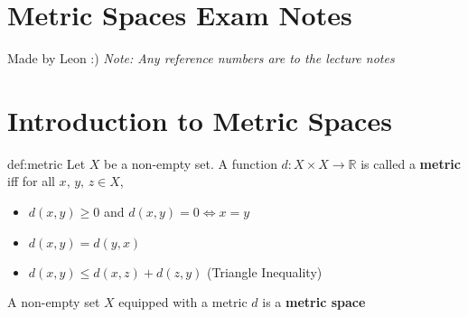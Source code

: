 \documentclass[landscape, 8pt]{extarticle}
\begin{document}
\setlength{\abovedisplayskip}{3.5pt}
\setlength{\belowdisplayskip}{3.5pt}
\setlength{\abovedisplayshortskip}{3.5pt}
\setlength{\belowdisplayshortskip}{3.5pt}

\begin{multicols}{3}
\raggedcolumns


\section*{\huge Metric Spaces Exam Notes}
Made by Leon :) \textit{Note: Any reference numbers are to the lecture notes}

\vspace{-5pt}
\section{Introduction to Metric Spaces}

\begin{thm}{def:metric}{}
    \vspace{-5pt}
    Let $X$ be a non-empty set. A function $d: X \times X \to \mathbb{R} $ is called a \textbf{metric} iff for all $x,\,y,\,z\in X$,
    \vspace{-3pt}
    \begin{itemize}
        \item $d(x,y)\ge 0$ and $d(x,y)=0 \iff x = y$
        \item $d(x,y)=d(y,x)$
        \item $d(x,y)\le d(x,z)+d(z,y)$ (Triangle Inequality)
    \end{itemize}
    \vspace{-5pt}
    A non-empty set $X$ equipped with a metric $d$ is a \textbf{metric space}
\end{thm}


\end{multicols}
\end{document}

